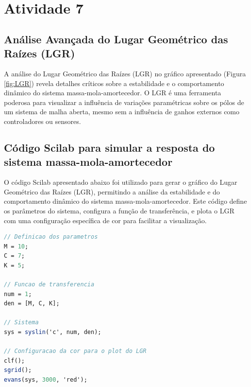 \section{Atividade 7}

\subsection{Análise Avançada do Lugar Geométrico das Raízes (LGR)}

A análise do Lugar Geométrico das Raízes (LGR) no gráfico apresentado (Figura \ref{fig:LGR}) revela detalhes críticos sobre a estabilidade e o comportamento dinâmico do sistema massa-mola-amortecedor. O LGR é uma ferramenta poderosa para visualizar a influência de variações paramétricas sobre os pólos de um sistema de malha aberta, mesmo sem a influência de ganhos externos como controladores ou sensores.

\subsection{Código Scilab para simular a resposta do sistema massa-mola-amortecedor}

O código Scilab apresentado abaixo foi utilizado para gerar o gráfico do Lugar Geométrico das Raízes (LGR), permitindo a análise da estabilidade e do comportamento dinâmico do sistema massa-mola-amortecedor. Este código define os parâmetros do sistema, configura a função de transferência, e plota o LGR com uma configuração específica de cor para facilitar a visualização.

\begin{lstlisting}[language=Scilab, caption=Código Scilab para simular o Lugar geométrico das raízes]
// Definicao dos parametros
M = 10;
C = 7;
K = 5;

// Funcao de transferencia
num = 1;
den = [M, C, K];

// Sistema
sys = syslin('c', num, den);

// Configuracao da cor para o plot do LGR
clf();
sgrid();
evans(sys, 3000, 'red');
\end{lstlisting}

